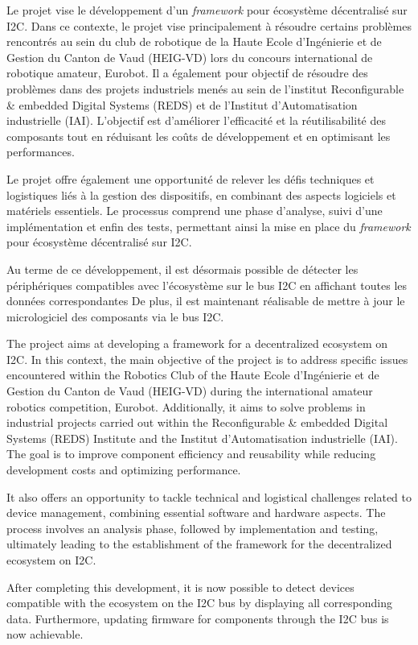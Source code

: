 Le projet vise le développement d'un \textit{framework} pour écosystème décentralisé sur I2C.
Dans ce contexte, le projet vise principalement à résoudre certains problèmes rencontrés au sein du club de robotique de la Haute Ecole d'Ingénierie et de Gestion du Canton de Vaud (HEIG-VD) lors du concours international de robotique amateur, Eurobot.
Il a également pour objectif de résoudre des problèmes dans des projets industriels menés au sein de l'institut Reconfigurable \& embedded Digital Systems (REDS) et de l'Institut d'Automatisation industrielle (IAI).
L'objectif est d'améliorer l'efficacité et la réutilisabilité des composants tout en réduisant les coûts de développement et en optimisant les performances.

Le projet offre également une opportunité de relever les défis techniques et logistiques liés à la gestion des dispositifs, en combinant des aspects logiciels et matériels essentiels.
Le processus comprend une phase d'analyse, suivi d'une implémentation et enfin des tests, permettant ainsi la mise en place du \textit{framework} pour écosystème décentralisé sur I2C.

Au terme de ce développement, il est désormais possible de détecter les périphériques compatibles avec l'écosystème sur le bus I2C en affichant toutes les données correspondantes
De plus, il est maintenant réalisable de mettre à jour le micrologiciel des composants via le bus I2C.

\asterism

The project aims at developing a framework for a decentralized ecosystem on I2C.
In this context, the main objective of the project is to address specific issues encountered within the Robotics Club of the Haute Ecole d’Ingénierie et de Gestion du Canton de Vaud (HEIG-VD) during the international amateur robotics competition, Eurobot.
Additionally, it aims to solve problems in industrial projects carried out within the Reconfigurable \& embedded Digital Systems (REDS) Institute and the Institut d'Automatisation industrielle (IAI).
The goal is to improve component efficiency and reusability while reducing development costs and optimizing performance.

It also offers an opportunity to tackle technical and logistical challenges related to device management, combining essential software and hardware aspects.
The process involves an analysis phase, followed by implementation and testing, ultimately leading to the establishment of the framework for the decentralized ecosystem on I2C.

After completing this development, it is now possible to detect devices compatible with the ecosystem on the I2C bus by displaying all corresponding data.
Furthermore, updating firmware for components through the I2C bus is now achievable.